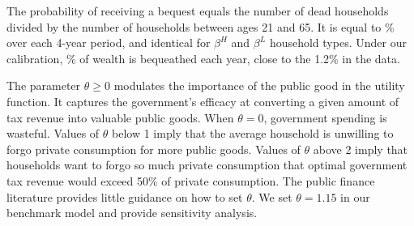 \documentclass[letterpaper,12pt,dvipsnames,usenames]{article}
\newcommand{\comment}[1]{\ifcomments {\color{red} [#1]} \fi}
\theoremstyle{definition}
\begin{document}
\begin{spacing}{1.25}
The probability of receiving a bequest equals the number of dead households divided by the number of households between ages 21 and 65. It is equal to {\Probbequest}\% over each 4-year period, and identical for $\beta^H$ and $\beta^L$ household types. Under our calibration, {\fracbeqann}\% of wealth is bequeathed each year, close to the 1.2\% in the data.

The parameter $\theta\geq 0$ modulates the importance of the public good in the utility function. It captures the government's efficacy at converting a given amount of tax revenue into valuable public goods. When $\theta=0$, government spending is wasteful. Values of $\theta$ below 1 imply that the average household is unwilling to forgo private consumption for more public goods. Values of $\theta$ above 2 imply that households want to forgo so much private consumption that optimal government tax revenue would exceed 50\% of private consumption. The public finance literature provides little guidance on how to set $\theta$. We set $\theta = 1.15$  in our benchmark model and provide sensitivity analysis.


\end{spacing}
\end{document}

